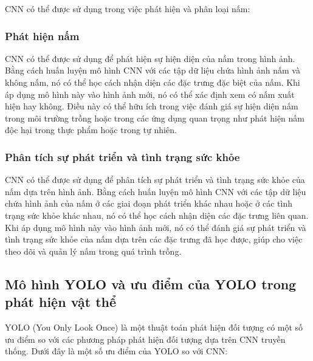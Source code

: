 CNN có thể được sử dụng trong việc phát hiện và phân loại nấm:

\subsubsection{Phát hiện nấm}
CNN có thể được sử dụng để phát hiện sự hiện diện của nấm trong hình ảnh. Bằng cách huấn luyện mô hình CNN với các tập dữ liệu chứa hình ảnh nấm và không nấm, nó có thể học cách nhận diện các đặc trưng đặc biệt của nấm. Khi áp dụng mô hình này vào hình ảnh mới, nó có thể xác định xem có nấm xuất hiện hay không. Điều này có thể hữu ích trong việc đánh giá sự hiện diện nấm trong môi trường trồng hoặc trong các ứng dụng quan trọng như phát hiện nấm độc hại trong thực phẩm hoặc trong tự nhiên.

\subsubsection{Phân tích sự phát triển và tình trạng sức khỏe}
CNN có thể được sử dụng để phân tích sự phát triển và tình trạng sức khỏe của nấm dựa trên hình ảnh. Bằng cách huấn luyện mô hình CNN với các tập dữ liệu chứa hình ảnh của nấm ở các giai đoạn phát triển khác nhau hoặc ở các tình trạng sức khỏe khác nhau, nó có thể học cách nhận diện các đặc trưng liên quan. Khi áp dụng mô hình này vào hình ảnh mới, nó có thể đánh giá sự phát triển và tình trạng sức khỏe của nấm dựa trên các đặc trưng đã học được, giúp cho việc theo dõi và quản lý nấm trong quá trình trồng.

\subsection{Mô hình YOLO và ưu điểm của YOLO trong phát hiện vật thể}

YOLO (You Only Look Once) là một thuật toán phát hiện đối tượng có một số ưu điểm so với các phương pháp phát hiện đối tượng dựa trên CNN truyền thống. Dưới đây là một số ưu điểm của YOLO so với CNN:


